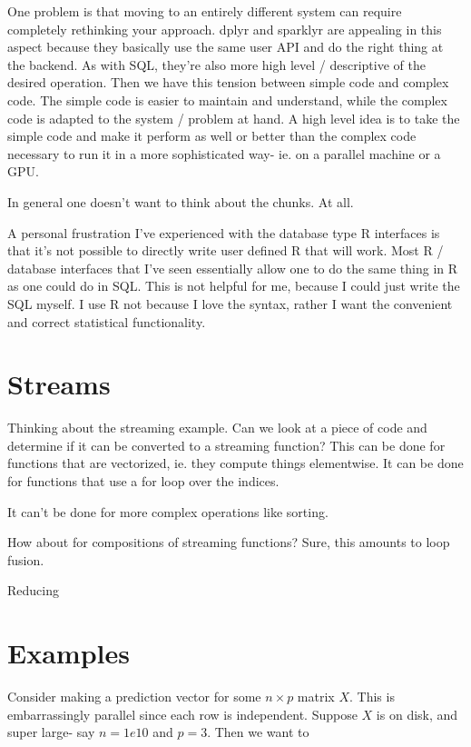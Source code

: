 \documentclass[12pt]{article}
\begin{document}
One problem is that moving to an entirely different system can require
completely rethinking your approach. dplyr and sparklyr are appealing in this
aspect because they basically use the same user API and do the right
thing at the backend. As with SQL, they're also more high level / descriptive of the
desired operation. Then we have this tension between simple code and
complex code. The simple code is easier to maintain and understand, while
the complex code is adapted to the system / problem at hand. A high level
idea is to take the simple code and make it perform as well or better than
the complex code necessary to run it in a more sophisticated way- ie. on a
parallel machine or a GPU.

In general one doesn't want to think about the chunks. At all.

A personal frustration I've experienced with the database type R interfaces
is that it's not possible to directly write user defined R that will work.
Most R / database interfaces that I've seen essentially allow one to do the
same thing in R as one could do in SQL. This is not helpful for me, because
I could just write the SQL myself. I use R not because I love the syntax,
rather I want the convenient and correct statistical functionality.

\section{Streams}

Thinking about the streaming example. Can we look at a
piece of code and determine if it can be converted to a streaming function?
This can be done for functions that are vectorized, ie. they compute things
elementwise. It can be done for functions that use a for loop over the
indices. 

It can't be done for more complex operations like sorting.

How about for compositions of streaming functions? Sure, this amounts to
loop fusion.

Reducing

\section{Examples}

Consider making a prediction vector for some $n \times p$ matrix $X$. This
is embarrassingly parallel since each row is independent. Suppose $X$ is on
disk, and super large- say $n = 1e10$ and $p = 3$. Then we want to 
\end{document}
